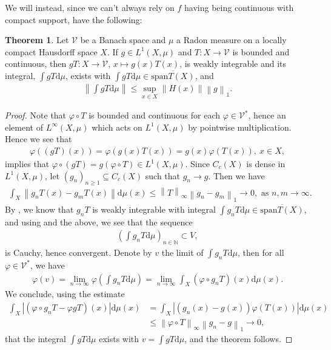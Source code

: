 \documentclass[10pt,twoside,openany,final]{memoir}
\theoremstyle{definition}
\newtheorem{theorem}{Theorem}[chapter]
\theoremstyle{Break}
\newcommand{\lv}{\left\lVert}
\newcommand{\rv}{\right\rVert}
\newcommand{\N}{\mathbb{N}}
\renewcommand{\d}{\mathrm{d}}
\begin{document}
We will instead, since we can't always rely on $f$ having being continuous with compact support, have the following:
\begin{theorem}
	Let $\mathcal{V}$ be a Banach space and $\mu$ a Radon measure on a locally compact Hausdorff space $X$. If $g \in L^1(X,\mu)$ and $T \colon X \to \mathcal{V}$ is bounded and continuous, then $gT\colon X \to \mathcal{V}$, $x \mapsto g(x) T(x)$, is weakly integrable and its integral, $\int gT \d \mu$, exists with $\int gT \d \mu \in \overline{\mathrm{span}T(X)}$, and
	\begin{align}
		\lv \int gT \d \mu \rv \leq \sup_{x \in X} \lv H(x) \rv \lv g \rv_1.
		\label{A3.4}
	\end{align}
	\label{A3.3}
\end{theorem}
\begin{proof}
	Note that $\varphi \circ T$ is bounded and continuous for each $\varphi \in \mathcal{V}^*$, hence an element of $L^\infty(X,\mu)$ which acts on $L^1(X,\mu)$ by pointwise multiplication. Hence we see that
	\begin{align*}
		\varphi( (gT)(x))=\varphi(g(x)T(x))=g(x)\varphi(T(x)), \ x \in X, 
	\end{align*}
	implies that $\varphi \circ (gT)=g(\varphi \circ T) \in L^1(X,\mu)$. Since $C_c(X)$ is dense in $L^1(X,\mu)$, let $(g_n)_{n \geq 1} \subseteq C_c(X)$ such that $g_n \to g$. Then we have
	\begin{align*}
		\int_X \lv g_n T (x) - g_m T(x) \rv \d \mu(x) \leq \lv T \rv_\infty \lv g_n-g_m\rv_1 \to 0, \text{ as } n,m \to \infty.
	\end{align*}
	By , we know that $g_n T$ is weakly integrable with integral $\int g_n T \d \mu \in \overline{\mathrm{span}T(X)}$, and using  and the above, we see that the sequence 
	\begin{align*}
		(\int g_n T \d \mu)_{n \in \N} \subset V,
	\end{align*}
	is Cauchy, hence convergent. Denote by $v$ the limit of $\int g_n T \d \mu$, then for all $\varphi \in \mathcal{V}^*$, we have
	\begin{align*}
		\varphi(v) = \lim_{n \to \infty} \varphi\left(\int g_n T \d \mu\right) = \lim_{n \to \infty} \int_X (\varphi \circ g_nT)(x) \d \mu(x).
	\end{align*}
	We conclude, using the estimate
	\begin{align*}
		\int_X |(\varphi \circ g_nT-\varphi gT)(x)| \d \mu(x)&=\int_X |(g_n(x)-g(x))\varphi(T(x))|\d \mu(x) \\
		&\leq  \lv \varphi \circ T\rv_\infty \lv g_n-g\rv_1 \to 0,
	\end{align*}
	that the integral $\int gT \d \mu$ exists with $v=\int gT \d \mu$, and the theorem follows. 
\end{proof}


\printbibliography
\end{document}
